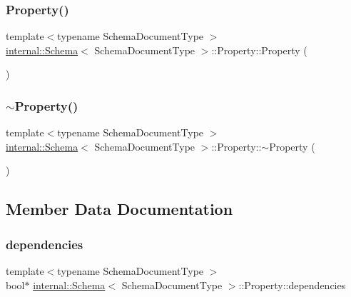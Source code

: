 \subsubsection{\texorpdfstring{Property()}{Property()}}
{\footnotesize\ttfamily template$<$typename Schema\+Document\+Type $>$ \\
\hyperlink{classinternal_1_1Schema}{internal\+::\+Schema}$<$ Schema\+Document\+Type $>$\+::Property\+::\+Property (\begin{DoxyParamCaption}{ }\end{DoxyParamCaption})\hspace{0.3cm}{\ttfamily [inline]}}

\mbox{\label{structinternal_1_1Schema_1_1Property_a801cac647ec64cc4dd4851d1c7613803}} 
\subsubsection{\texorpdfstring{$\sim$\+Property()}{~Property()}}
{\footnotesize\ttfamily template$<$typename Schema\+Document\+Type $>$ \\
\hyperlink{classinternal_1_1Schema}{internal\+::\+Schema}$<$ Schema\+Document\+Type $>$\+::Property\+::$\sim$\+Property (\begin{DoxyParamCaption}{ }\end{DoxyParamCaption})\hspace{0.3cm}{\ttfamily [inline]}}



\subsection{Member Data Documentation}
\mbox{\label{structinternal_1_1Schema_1_1Property_a942c0457543b8ee3fdda3fbb29fc4598}} 
\subsubsection{\texorpdfstring{dependencies}{dependencies}}
{\footnotesize\ttfamily template$<$typename Schema\+Document\+Type $>$ \\
bool$\ast$ \hyperlink{classinternal_1_1Schema}{internal\+::\+Schema}$<$ Schema\+Document\+Type $>$\+::Property\+::dependencies}

